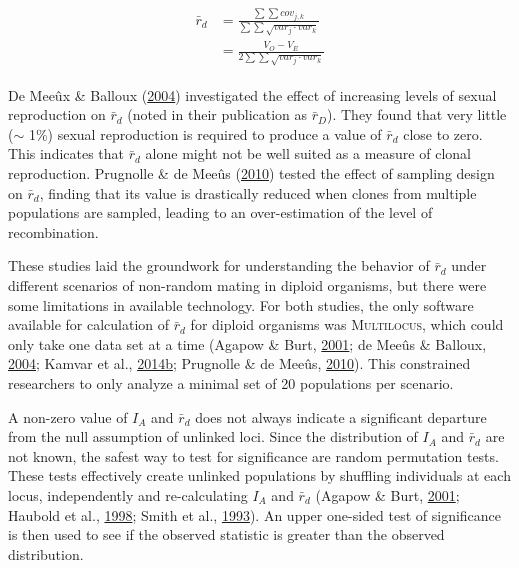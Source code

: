 \documentclass[double,11pt]{beavtex}
\begin{document}
  \begin{align} %
  \begin{split} %
  \bar{r}_d &= \frac{\sum\sum{cov_{j,k}}}{
                     \sum\sum{\sqrt{var_{j} \cdot var_{k}}}} \\
            &= \frac{V_O - V_E}{2\sum\sum{\sqrt{var_{j} \cdot var_{k}}}}
  \end{split}
  \label{eq:rd}
  \end{align}
  
  De Meeûx \& Balloux (\protect\hyperlink{ref-de2004clonal}{2004})
  investigated the effect of increasing levels of sexual reproduction on
  \(\bar{r}_d\) (noted in their publication as \(\bar{r}_D\)). They found
  that very little (\(\sim\) 1\%) sexual reproduction is required to
  produce a value of \(\bar{r}_d\) close to zero. This indicates that
  \(\bar{r}_d\) alone might not be well suited as a measure of clonal
  reproduction. Prugnolle \& de Meeûs
  (\protect\hyperlink{ref-prugnolle2010apparent}{2010}) tested the effect
  of sampling design on \(\bar{r}_d\), finding that its value is
  drastically reduced when clones from multiple populations are sampled,
  leading to an over-estimation of the level of recombination.
  
  These studies laid the groundwork for understanding the behavior of
  \(\bar{r}_d\) under different scenarios of non-random mating in diploid
  organisms, but there were some limitations in available technology. For
  both studies, the only software available for calculation of
  \(\bar{r}_d\) for diploid organisms was \textsc{Multilocus}, which could
  only take one data set at a time (Agapow \& Burt,
  \protect\hyperlink{ref-Agapow_2001}{2001}; de Meeûs \& Balloux,
  \protect\hyperlink{ref-de2004clonal}{2004}; Kamvar et al.,
  \protect\hyperlink{ref-kamvar2014poppr}{2014}\protect\hyperlink{ref-kamvar2014poppr}{b};
  Prugnolle \& de Meeûs,
  \protect\hyperlink{ref-prugnolle2010apparent}{2010}). This constrained
  researchers to only analyze a minimal set of 20 populations per
  scenario.
  
  A non-zero value of \(I_A\) and \(\bar{r}_d\) does not always indicate a
  significant departure from the null assumption of unlinked loci. Since
  the distribution of \(I_A\) and \(\bar{r}_d\) are not known, the safest
  way to test for significance are random permutation tests. These tests
  effectively create unlinked populations by shuffling individuals at each
  locus, independently and re-calculating \(I_A\) and \(\bar{r}_d\)
  (Agapow \& Burt, \protect\hyperlink{ref-Agapow_2001}{2001}; Haubold et
  al., \protect\hyperlink{ref-haubold1998detecting}{1998}; Smith et al.,
  \protect\hyperlink{ref-smith1993how}{1993}). An upper one-sided test of
  significance is then used to see if the observed statistic is greater
  than the observed distribution.
  
\end{document}
